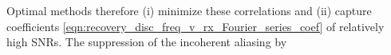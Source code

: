 Optimal methods therefore (i) minimize
these correlations and (ii) capture
 coefficients
\eqref{eqn:recovery_disc_freq_v_rx_Fourier_series_coef} of
relatively high \acp{SNR}.
The suppression of
the incoherent aliasing by
